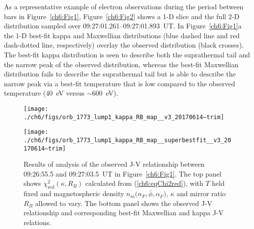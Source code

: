 
  As a representative example of electron observations during the period between
  bars in Figure~\ref{ch6:Fig1}, Figure~\ref{ch6:Fig2} shows a 1-D slice and the
  full 2-D distribution sampled over 09:27:01.261--09:27:01.893~UT. In
  Figure~\ref{ch6:Fig1}a the 1-D best-fit kappa and Maxwellian distributions
  (blue dashed line and red dash-dotted line, respectively) overlay the observed
  distribution (black crosses). The best-fit kappa distribution is seen to
  describe both the suprathermal tail and the narrow peak of the observed
  distribution, whereas the best-fit Maxwellian distribution fails to describe
  the suprathermal tail but is able to describe the narrow peak via a best-fit
  temperature that is low compared to the observed temperature (40~eV versus
  $\sim$600~eV).


  \begin{figure}
    \centering

    \noindent\texttt{[image: ./ch6/figs/orb\_1773\_lump1\_kappa\_RB\_map\_\_v3\_20170614--trim]}

    \vspace{1cm}

    \noindent\texttt{[image: ./ch6/figs/orb\_1773\_lump1\_kappa\_RB\_map\_\_superbestfit\_\_v3\_20170614--trim]}

    \caption[Orbit 1773: Reduced chi-squared values for observed J-V
    relationship with $T$ held fixed and magnetospheric density
    $n_m \big ( n_F, \bar{\phi}, \alpha_F \big )$ $\kappa$ and $R_B$ allowed to
    vary, and corresponding best-fit J-V curves.]{Results of analysis of the
      observed J-V relationship between 09:26:55.5 and 09:27:03.5~UT in
      Figure~\ref{ch6:Fig1}. The top panel shows
      $\chi^2_{\mathrm{red}} ( \kappa, R_B)$ calculated from
      (\ref{ch6:eqChi2red}), with $T$ held fixed and magnetospheric density
      $n_m \big ( n_F, \bar{\phi}, \alpha_F \big )$, $\kappa$ and mirror ratio
      $R_B$ allowed to vary. The bottom panel shows the observed J-V
      relationship and corresponding best-fit Maxwellian and kappa J-V
      relations.}
    \label{ch6:Fig3}
  \end{figure}

